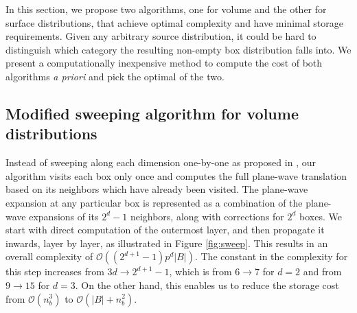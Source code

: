 In this section, we propose two algorithms, one for volume and the other for surface distributions, that achieve optimal complexity and have minimal storage requirements. Given any arbitrary source distribution, it could be hard to distinguish which category the resulting non-empty box distribution falls into. We present a computationally inexpensive method to compute the cost of both algorithms {\em a priori} and pick the optimal of the two. 

\subsection{Modified sweeping algorithm for volume distributions} 
\label{sec:sweep}

Instead of sweeping along each dimension one-by-one as proposed 
in \cite{fggt}, our algorithm visits each box only once and computes the full plane-wave
translation based on its neighbors which have already been visited. The
plane-wave expansion at any particular box is represented as a combination of the
plane-wave expansions of its $2^{d} -1$ neighbors, along with corrections for
$2^d$ boxes. We start with direct computation of the outermost layer, and then propagate it inwards, layer by layer, as illustrated in Figure \ref{fig:sweep}. This results in an overall complexity of $\mathcal{O}((2^{d+1} -1)p^d|B|)$. The constant in the complexity for this step increases from $3d\rightarrow2^{d+1} - 1$, which is
from $6\rightarrow7$ for $d=2$ and from $9\rightarrow15$ for $d=3$. On the other hand, this enables us to reduce the storage cost from $\mathcal{O}(n_b^3)$ to $\mathcal{O}(|B| + n_b^2)$.

